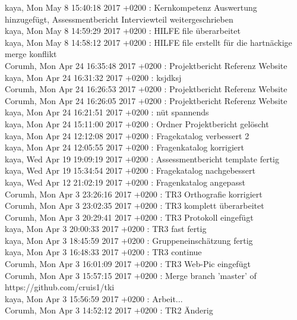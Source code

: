 kaya, Mon May 8 15:40:18 2017 +0200 : Kernkompetenz Auswertung hinzugefügt, Assessmentbericht Interviewteil weitergeschrieben \\
kaya, Mon May 8 14:59:29 2017 +0200 : HILFE file überarbeitet \\
kaya, Mon May 8 14:58:12 2017 +0200 : HILFE file erstellt für die hartnäckige merge konflikt \\
Corumh, Mon Apr 24 16:35:48 2017 +0200 : Projektbericht Referenz Website \\
kaya, Mon Apr 24 16:31:32 2017 +0200 : ksjdksj \\
Corumh, Mon Apr 24 16:26:53 2017 +0200 : Projektbericht Referenz Website \\
Corumh, Mon Apr 24 16:26:05 2017 +0200 : Projektbericht Referenz Website \\
kaya, Mon Apr 24 16:21:51 2017 +0200 : nüt spannends \\
kaya, Mon Apr 24 15:11:00 2017 +0200 : Ordner Projektbericht gelöscht \\
kaya, Mon Apr 24 12:12:08 2017 +0200 : Fragekatalog verbessert 2 \\
kaya, Mon Apr 24 12:05:55 2017 +0200 : Fragenkatalog korrigiert \\
kaya, Wed Apr 19 19:09:19 2017 +0200 : Assessmentbericht template fertig \\
kaya, Wed Apr 19 15:34:54 2017 +0200 : Fragekatalog nachgebessert \\
kaya, Wed Apr 12 21:02:19 2017 +0200 : Fragenkatalog angepasst \\
Corumh, Mon Apr 3 23:26:16 2017 +0200 : TR3 Orthografie korrigiert \\
Corumh, Mon Apr 3 23:02:35 2017 +0200 : TR3 komplett überarbeitet \\
Corumh, Mon Apr 3 20:29:41 2017 +0200 : TR3 Protokoll eingefügt \\
kaya, Mon Apr 3 20:00:33 2017 +0200 : TR3 fast fertig \\
kaya, Mon Apr 3 18:45:59 2017 +0200 : Gruppeneinschätzung fertig \\
kaya, Mon Apr 3 16:48:33 2017 +0200 : TR3 continue \\
Corumh, Mon Apr 3 16:01:09 2017 +0200 : TR3 Web-Pic eingefügt \\
Corumh, Mon Apr 3 15:57:15 2017 +0200 : Merge branch 'master' of https://github.com/cruis1/tki \\
kaya, Mon Apr 3 15:56:59 2017 +0200 : Arbeit... \\
Corumh, Mon Apr 3 14:52:12 2017 +0200 : TR2 Änderig\\
